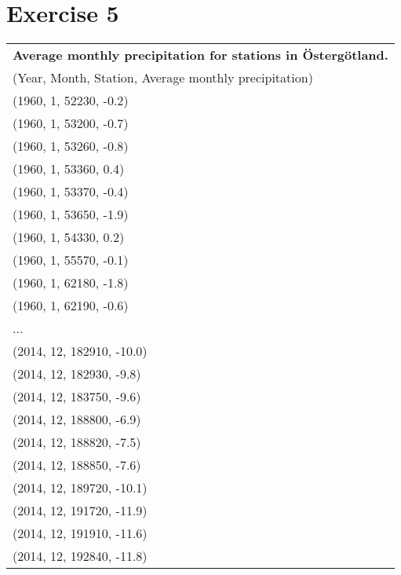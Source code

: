 \documentclass[a4paper,titlepage,12pt]{article}
\begin{document}
\section{Exercise 5}
\begin{tabular}{l}
  \bf Average monthly precipitation for stations in Östergötland. \\ 
  (Year, Month, Station, Average monthly precipitation) \\
  \hline
  (1960, 1, 52230, -0.2) \\ 
  (1960, 1, 53200, -0.7) \\ 
  (1960, 1, 53260, -0.8) \\
  (1960, 1, 53360, 0.4)  \\
  (1960, 1, 53370, -0.4) \\
  (1960, 1, 53650, -1.9) \\
  (1960, 1, 54330, 0.2)  \\
  (1960, 1, 55570, -0.1) \\
  (1960, 1, 62180, -1.8) \\
  (1960, 1, 62190, -0.6) \\
  ... \\
  (2014, 12, 182910, -10.0) \\
  (2014, 12, 182930, -9.8)  \\
  (2014, 12, 183750, -9.6)  \\
  (2014, 12, 188800, -6.9)  \\
  (2014, 12, 188820, -7.5)  \\
  (2014, 12, 188850, -7.6)  \\
  (2014, 12, 189720, -10.1) \\
  (2014, 12, 191720, -11.9) \\
  (2014, 12, 191910, -11.6) \\
  (2014, 12, 192840, -11.8) \\
\end{tabular}
\end{document}

